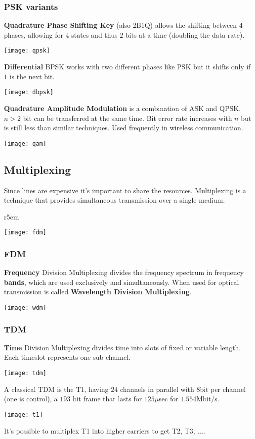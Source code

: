 \subsubsection{PSK variants}
\textbf{Quadrature Phase Shifting Key} (also 2B1Q) allows the shifting between $4$ phases, allowing for $4$ states and thus $2$ bits at a time (doubling the data rate).
\begin{center}
	\texttt{[image: qpsk]}
\end{center}
\textbf{Differential} BPSK works with two different phases like PSK but it shifts only if $1$ is the next bit.
\begin{center}
	\texttt{[image: dbpsk]}
\end{center}
\textbf{Quadrature Amplitude Modulation} is a combination of ASK and QPSK. $n >2$ bit can be transferred at the same time. Bit error rate increases with $n$ but is still less than similar techniques. Used frequently in wireless communication.
\begin{center}
	\texttt{[image: qam]}
\end{center}

\subsection{Multiplexing}
Since lines are expensive it's important to share the resources. Multiplexing is a technique that provides simultaneous transmission over a single medium.\\
\begin{wrapfigure}[7]{r}{5cm}
	\begin{center}
		\texttt{[image: fdm]}
	\end{center}
\end{wrapfigure}
\subsubsection{FDM}
\textbf{Frequency} Division Multiplexing divides the frequency spectrum in frequency \textbf{bands}, which are used exclusively and simultaneously. When used for optical transmission is called \textbf{Wavelength Division Multiplexing}.
\begin{center}
	\texttt{[image: wdm]}
\end{center}

\subsubsection{TDM}
\textbf{Time} Division Multiplexing divides time into slots of fixed or variable length. Each timeslot represents one sub-channel.
\begin{center}
	\texttt{[image: tdm]}
\end{center}
A classical TDM is the T1, having $24$ channels in parallel with $8$bit per channel (one is control), a $193$ bit frame that lasts for $125\mu$sec for $1.554$Mbit/s.
\begin{center}
	\texttt{[image: t1]}
\end{center}
It's possible to multiplex T1 into higher carriers to get T2, T3, $\ldots$.

